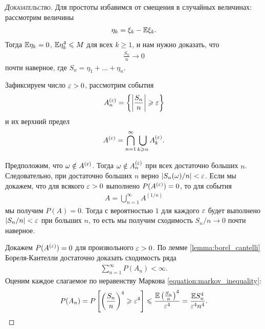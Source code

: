 \documentclass[../main.tex]{subfiles}
\begin{document}
\begin{proof}[\normalfont\textsc{Доказательство}]
 Для простоты избавимся от смещения в случайных величинах: рассмотрим величины
 \begin{align*}
  \eta_k = \xi_k - \mathbb E\xi_k.
 \end{align*} Тогда $ \mathbb E\eta_k = 0 $, $ \mathbb E \eta_k^{4} \leqslant M $ для всех $ k \geqslant 1 $, и нам нужно доказать, что
 \begin{align*}
  \frac{S_n}{n} \to 0
 \end{align*} почти наверное, где $ S_n = \eta_1 + \ldots + \eta_n $.

 Зафиксируем число $ \varepsilon > 0 $, рассмотрим события
 \begin{align*}
  A_n^{(\varepsilon)} = \left\{ \left| \frac{S_n}{n} \right| \geqslant \varepsilon \right\}
 \end{align*} и их верхний предел
 \begin{align*}
  A^{(\varepsilon)} = \bigcap_{n=1}^{\infty} \bigcup_{k\geqslant n} A_k^{(\varepsilon)}.
 \end{align*}

 Предположим, что $ \omega \notin A^{(\varepsilon)} $. Тогда $ \omega \notin A_n^{(\varepsilon)} $ при всех достаточно больших $ n $. Следовательно, при достаточно больших $ n $ верно $ \left| S_n(\omega)/n \right| < \varepsilon $. Если мы докажем, что для всякого $ \varepsilon > 0 $ выполнено  $ P(A^{(\varepsilon)}) = 0 $, то для события
 \begin{align*}
  A = \bigcup_{n=1}^{\infty} A^{(1 / n)}
 \end{align*} мы получим $ P(A) = 0 $. Тогда с вероятностью  $ 1 $  для каждого $ \varepsilon $ будет выполнено  $ \left| S_n/n \right| < \varepsilon $ при больших $ n $, то есть мы получим сходимость $ S_n/n \to 0 $  почти наверное.

 Докажем $ P(A^{(\varepsilon)}) = 0 $ для произвольного $ \varepsilon > 0 $. По лемме \ref{lemma:borel_cantelli} Бореля-Кантелли достаточно доказать сходимость ряда
 \begin{align}
  \label{eq:uzbch_series}
  \sum_{n=1}^{\infty} P(A_n) < \infty.
 \end{align} Оценим каждое слагаемое по неравенству Маркова \eqref{equation:markov_inequality}:
 \begin{align*}
  P(A_n) = P \left[ \left( \frac{S_n}{n} \right)^{4} \geqslant \varepsilon^{4} \right] \leqslant \frac{\mathbb E \left( \frac{S_n}{n} \right)^{4}}{\varepsilon^{4}} = \frac{\mathbb E S_n^{4}}{\varepsilon^{4} n^{4}}.
 \end{align*} 


\end{proof}
\end{document}
